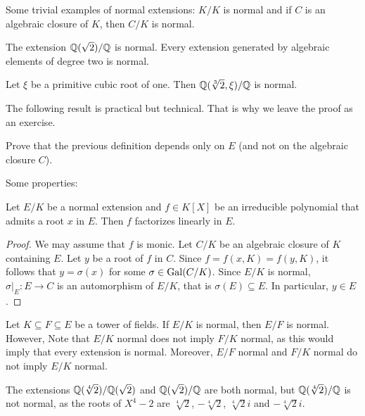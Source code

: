 Some trivial examples of normal extensions: $K/K$ is normal
and if $C$ is an algebraic closure of $K$, then $C/K$ is normal. 

\begin{example}
    The extension $\mathbb{Q}(\sqrt{2})/\mathbb{Q}$ is normal. 
    Every extension generated by algebraic elements of degree two is normal. 
\end{example}

\begin{exercise}
\label{xca:Q(sqrt[3]{2},xi) normal}
    Let $\xi$ be a primitive cubic root of one. Then 
    $\mathbb{Q}(\sqrt[3]{2},\xi)/\mathbb{Q}$ is normal. 
\end{exercise}

The following result is practical but technical. That is why we leave the proof
as an exercise. 

\begin{exercise}
    Prove that the previous definition depends only on $E$ (and not on the
    algebraic closure $C$). 
\end{exercise}

Some properties:

\begin{proposition}
\label{pro:linear_factorization}
    Let $E/K$ be a normal extension and $f\in K[X]$ be an irreducible polynomial
    that admits a root $x$ in $E$. Then $f$ factorizes
    linearly in $E$.
\end{proposition}

\begin{proof}
    We may assume that $f$ is monic. Let $C/K$ be an algebraic closure of $K$ containing $E$. 
    Let $y$ be a root of $f$ in $C$. Since $f=f(x,K)=f(y,K)$, 
    it follows that $y=\sigma(x)$ for some $\sigma\in\operatorname{Gal}(C/K)$. Since 
    $E/K$ is normal, $\sigma|_E\colon E\to C$ is an automorphism of $E/K$, that is
    $\sigma(E)\subseteq E$. In particular, $y\in E$. 
\end{proof}

Let $K\subseteq F\subseteq E$ be a tower of fields. 
If $E/K$ is normal, then $E/F$ is normal. However, 
Note that $E/K$ normal does not imply $F/K$ normal, as this would imply 
that every extension is normal. Moreover, 
$E/F$ normal and $F/K$ normal do not imply $E/K$ normal.
    
\begin{example}
The extensions $\mathbb{Q}(\sqrt[4]{2})/\mathbb{Q}(\sqrt{2})$ and $\mathbb{Q}(\sqrt{2})/\mathbb{Q}$ are both
normal, but $\mathbb{Q}(\sqrt[4]{2})/\mathbb{Q}$ is not normal, 
as the roots of $X^4-2$ are
$\sqrt[4]{2}$, $-\sqrt[4]{2}$, $\sqrt[4]{2}i$ and $-\sqrt[4]{2}i$.
\end{example}


